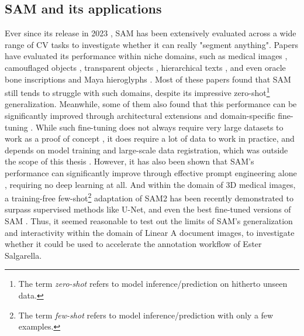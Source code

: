 \subsection{SAM and its applications}
Ever since its release in 2023 \parencite{sam}, \acs{SAM} has been extensively evaluated across a wide range of \acs{CV} tasks to investigate whether it can really "segment anything".
Papers have evaluated its performance within niche domains, such as medical images \parencite{MedSAM}, camouflaged objects \parencite{CamSAM}, transparent objects \parencite{TransparentSAM}, hierarchical texts \parencite{HiSAM}, and even oracle bone inscriptions \parencite{OBIFloSAM} and Maya hieroglyphs \parencite{MayaSAM}. 
Most of these papers found that \acs{SAM} still tends to struggle with such domains, despite its impressive zero-shot\footnote{The term \textit{zero-shot} refers to model inference/prediction on hitherto unseen data.} generalization.
Meanwhile, some of them also found that this performance can be significantly improved through architectural extensions \parencite{OBIFloSAM} and domain-specific fine-tuning \parencite{MedSAM,MayaSAM}.
While such fine-tuning does not always require very large datasets to work as a proof of concept \parencite[see][]{MayaSAM}, it does require a lot of data to work in practice, and depends on model training and large-scale data registration, which was outside the scope of this thesis \parencite{DataCentricAI}.
However, it has also been shown that \acs{SAM}'s performance can significantly improve through effective prompt engineering alone \parencite{promptSAM}, requiring no deep learning at all.
And within the domain of 3D medical images, a training-free few-shot\footnote{The term \textit{few-shot} refers to model inference/prediction with only a few examples.} adaptation of \acs{SAM}2 \parencite[see][]{sam2} has been recently demonstrated to surpass supervised methods like U-Net, and even the best fine-tuned versions of \acs{SAM} \parencite{fatesam}.
Thus, it seemed reasonable to test out the limits of \acs{SAM}'s generalization and interactivity within the domain of Linear A document images, to investigate whether it could be used to accelerate the annotation workflow of Ester Salgarella.

